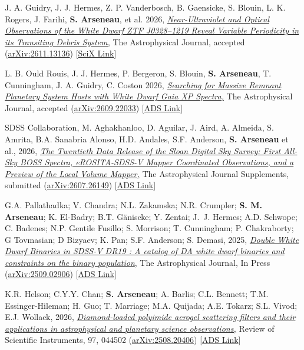 \documentclass[11pt]{article}       %
\newcommand{\doi}[2]{\emph{\href{http://dx.doi.org/#1}{{#2}}}}
\newcommand{\arxiv}[1]{{\href{http://arxiv.org/abs/#1}{arXiv:{#1}}}}
\begin{document}
\begin{etaremune}
  \item J. A. Guidry, J. J. Hermes, Z. P. Vanderbosch, B. Gaensicke, S. Blouin, L. K. Rogers, J. Farihi, \textbf{S. Arseneau}, et al. 2026, \doi{10.48550/arXiv.2611.13136}{Near-Ultraviolet and Optical Observations of the White Dwarf ZTF J0328--1219 Reveal Variable Periodicity in its Transiting Debris System,} The Astrophysical Journal, accepted (\arxiv{2611.13136}) [\href{https://scixplorer.org/abs/2026arXiv261113136G/abstract}{SciX Link}]

  \item L. B. Ould Rouis, J. J. Hermes, P. Bergeron, S. Blouin, \textbf{S. Arseneau}, T. Cunningham, J. A. Guidry, C. Coston 2026, \doi{10.3847/1538-4357/aeaa35}{Searching for Massive Remnant Planetary System Hosts with White Dwarf Gaia XP Spectra,} The Astrophysical Journal, accepted (\arxiv{2609.22033}) [\href{https://ui.adsabs.harvard.edu/abs/2026arXiv260922033/abstract}{ADS Link}]

    \item SDSS Collaboration, M. Aghakhanloo, D. Aguilar, J. Aird, A. Almeida, S. Amrita, B.A. Sanabria Alonso, H.D. Andales, S.F. Anderson, \textbf{S. Arseneau} et al., 2026, \doi{10.48550/arXiv.2607.26149}{The Twentieth Data Release of the Sloan Digital Sky Survey: First All-Sky BOSS Spectra, eROSITA-SDSS-V Mapper Coordinated Observations, and a Preview of the Local Volume Mapper,} The Astrophysical Journal Supplements, submitted (\arxiv{2607.26149}) [\href{https://ui.adsabs.harvard.edu/abs/2026arXiv260726149S/abstract}{ADS Link}]

    \item G.A. Pallathadka; V. Chandra; N.L. Zakamska; N.R. Crumpler; \textbf{S. M. Arseneau}; K. El-Badry; B.T. G\"aniscke; Y. Zentai; J.~J. Hermes; A.D. Schwope; C. Badenes; N.P. Gentile Fusillo; S. Morrison; T. Cunningham; P. Chakraborty; G Tovmasian; D Bizyaev; K. Pan; S.F. Anderson; S. Demasi, 2025, \doi{10.3847/1538-4357/ae593f}{Double White Dwarf Binaries in SDSS-V DR19 : A catalog of DA white dwarf binaries and constraints on the binary population}, The Astrophysical Journal, In Press (\arxiv{2509.02906}) [\href{https://ui.adsabs.harvard.edu/abs/2025arXiv250902906A}{ADS Link}]
  
    \item K.R. Helson; C.Y.Y. Chan; \textbf{S. Arseneau}; A. Barlis; C.L. Bennett; T.M. Essinger-Hileman; H. Guo; T. Marriage; M.A. Quijada; A.E. Tokarz; S.L. Vivod; E.J. Wollack, 2026, \doi{10.48550/arXiv.2508.20406}{Diamond-loaded polyimide aerogel scattering filters and their applications in astrophysical and planetary science observations,} Review of Scientific Instruments, 97, 044502 (\arxiv{2508.20406}) [\href{https://ui.adsabs.harvard.edu/abs/2025arXiv250820406H}{ADS Link}]
  

\end{etaremune}
\end{document}
